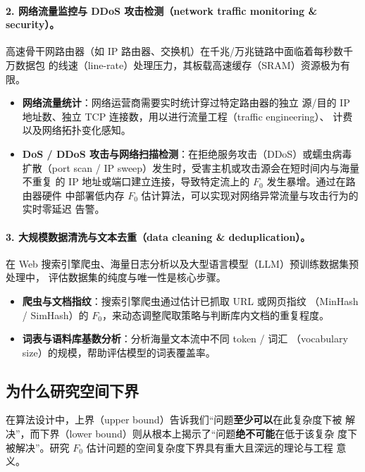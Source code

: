 \documentclass[UTF8, 11pt, a4paper, linestretch=1.15]{ctexart}
\theoremstyle{zhstyle}
\newcommand{\Fzero}{F_0}
\begin{document}
	\paragraph{2. 网络流量监控与 DDoS 攻击检测（network traffic monitoring \&
		security）。}
	高速骨干网路由器（如 IP 路由器、交换机）在千兆/万兆链路中面临着每秒数千万数据包
	的线速（line-rate）处理压力，其板载高速缓存（SRAM）资源极为有限。
	\begin{itemize}
		\item \textbf{网络流量统计}：网络运营商需要实时统计穿过特定路由器的独立
		源/目的 IP 地址数、独立 TCP 连接数，用以进行流量工程（traffic engineering）、
		计费以及网络拓扑变化感知。
		\item \textbf{DoS / DDoS 攻击与网络扫描检测}：在拒绝服务攻击（DDoS）或蠕虫病毒
		扩散（port scan / IP sweep）发生时，受害主机或攻击源会在短时间内与海量不重复
		的 IP 地址或端口建立连接，导致特定流上的 $\Fzero$ 发生暴增。通过在路由器硬件
		中部署低内存 $\Fzero$ 估计算法，可以实现对网络异常流量与攻击行为的实时零延迟
		告警。
	\end{itemize}
	
	\paragraph{3. 大规模数据清洗与文本去重（data cleaning \& deduplication）。}
	在 Web 搜索引擎爬虫、海量日志分析以及大型语言模型（LLM）预训练数据集预处理中，
	评估数据集的纯度与唯一性是核心步骤。
	\begin{itemize}
		\item \textbf{爬虫与文档指纹}：搜索引擎爬虫通过估计已抓取 URL 或网页指纹
		（MinHash / SimHash）的 $\Fzero$，来动态调整爬取策略与判断库内文档的重复程度。
		\item \textbf{词表与语料库基数分析}：分析海量文本流中不同 token / 词汇
		（vocabulary size）的规模，帮助评估模型的词表覆盖率。
	\end{itemize}
	
	\subsection{为什么研究空间下界}
	
	在算法设计中，上界（upper bound）告诉我们“问题\textbf{至少可以}在此复杂度下被
	解决”，而下界（lower bound）则从根本上揭示了“问题\textbf{绝不可能}在低于该复杂
	度下被解决”。研究 $\Fzero$ 估计问题的空间复杂度下界具有重大且深远的理论与工程
	意义。
	
\end{document}

